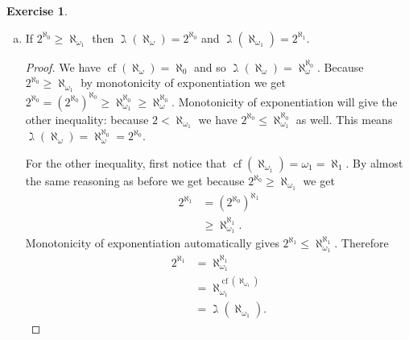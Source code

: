 \documentclass{article}
\theoremstyle{definition}
\newtheorem{question}{Exercise}
\DeclareMathOperator{\cof}{cf}
\begin{document}
\begin{question}
\begin{enumerate}[a.]
        \item If \(2^{\aleph_{0}}\geq\aleph_{\omega_{1}}\) then
              \(\gimel(\aleph_{\omega})=2^{\aleph_{0}}\) and
              \(\gimel(\aleph_{\omega_{1}})=2^{\aleph_{1}}\).

              \begin{proof}
                  We have \(\cof(\aleph_{\omega})=\aleph_{0}\) and so
                  \(\gimel(\aleph_{\omega})=\aleph_{\omega}^{\aleph_{0}}\).
                  Because \(2^{\aleph_{0}}\geq\aleph_{\omega_{1}}\) by
                  monotonicity of exponentiation we get
                  \(2^{\aleph_{0}}=\left(2^{\aleph_{0}}\right)^{\aleph_{0}}\geq\aleph_{\omega_{1}}^{\aleph_{0}}\geq\aleph_{\omega}^{\aleph_{0}}\).
                  Monotonicity of exponentiation will give the other inequality:
                  because \(2<\aleph_{\omega_{1}}\) we have
                  \(2^{\aleph_{0}}\leq\aleph_{\omega_{1}}^{\aleph_{0}}\) as
                  well. This means
                  \(\gimel(\aleph_{\omega})=\aleph_{\omega}^{\aleph_{0}}=2^{\aleph_{0}}\).

                  For the other inequality, first notice that
                  \(\cof(\aleph_{\omega_{1}})=\omega_{1}=\aleph_{1}\). By almost
                  the same reasoning as before we get because
                  \(2^{\aleph_{0}}\geq\aleph_{\omega_{1}}\) we get
                  \begin{align*}
                      2^{\aleph_{1}} & =\left(2^{\aleph_{0}}\right)^{\aleph_{1}} \\
                                     & \geq\aleph_{\omega_{1}}^{\aleph_{1}}.
                  \end{align*}
                  Monotonicity of exponentiation automatically gives
                  \(2^{\aleph_{1}}\leq\aleph_{\omega_{1}}^{\aleph_{1}}\).
                  Therefore
                  \begin{align*}
                      2^{\aleph_{1}} & =\aleph_{\omega_{1}}^{\aleph_{1}}                \\
                                     & =\aleph_{\omega_{1}}^{\cof(\aleph_{\omega_{1}})} \\
                                     & =\gimel(\aleph_{\omega_{1}}).
                  \end{align*}
              \end{proof}
    \end{enumerate}
\end{question}
\end{document}
